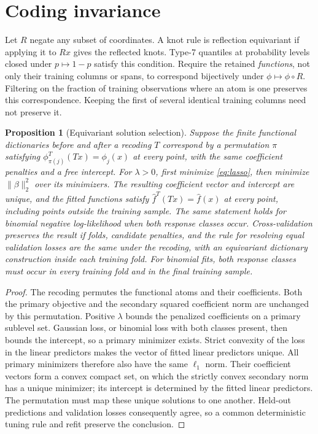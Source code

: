 \documentclass[11pt]{article}
\newtheorem{proposition}{Proposition}
\theoremstyle{definition}
\theoremstyle{remark}
\begin{document}
\section{Coding invariance}\label{sec:equiv}

Let $R$ negate any subset of coordinates. A knot rule is reflection
equivariant if applying it to $Rx$ gives the reflected knots. Type-7
quantiles at probability levels closed under $p\mapsto1-p$ satisfy this
condition. Require the retained \emph{functions}, not only their training
columns or spans, to correspond bijectively under $\phi\mapsto\phi\circ R$.
Filtering on the fraction of training observations where an atom is one
preserves this correspondence. Keeping the first of several identical
training columns need not preserve it.

\begin{proposition}[Equivariant solution selection]\label{prop:equiv}
Suppose the finite functional dictionaries before and after a recoding $T$
correspond by a permutation $\pi$ satisfying
$\phi^T_{\pi(j)}(Tx)=\phi_j(x)$ at every point, with the same coefficient
penalties and a free intercept.
For $\lambda>0$, first minimize \eqref{eq:lasso}, then minimize
$\|\beta\|_2^2$ over its minimizers. The resulting coefficient vector and
intercept are unique, and the fitted functions satisfy
$\hat f^{T}(Tx)=\hat f(x)$ at every point, including points outside the
training sample. The same statement holds for binomial negative
log-likelihood when both response classes occur. Cross-validation preserves
the result if folds, candidate penalties, and the rule for resolving equal
validation losses are the same under the recoding, with an equivariant
dictionary construction inside each training fold. For binomial fits,
both response classes must occur in every training fold and in the final
training sample.
\end{proposition}

\begin{proof}
The recoding permutes the functional atoms and their coefficients. Both the
primary objective and the secondary squared coefficient norm are unchanged
by this permutation. Positive $\lambda$ bounds the penalized coefficients
on a primary sublevel set. Gaussian loss, or binomial loss with both classes
present, then bounds the intercept, so a primary minimizer exists. Strict
convexity of the loss in the linear predictors makes the vector of fitted
linear predictors unique. All primary minimizers therefore also have the
same $\ell_1$ norm. Their coefficient vectors form a convex compact set,
on which the strictly convex secondary norm has a unique minimizer; its
intercept is determined by the fitted linear predictors. The permutation
must map these unique solutions to one another. Held-out predictions and
validation losses consequently agree, so a common deterministic tuning rule
and refit preserve the conclusion.
\end{proof}
\end{document}
